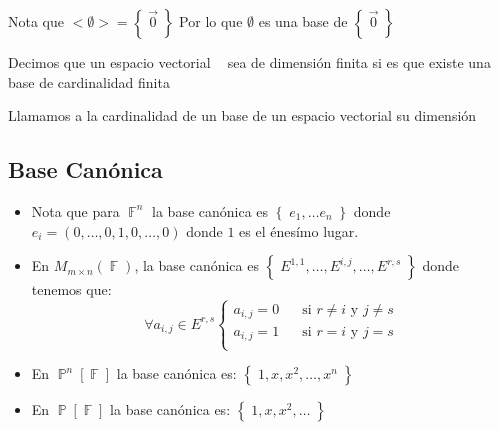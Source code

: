 \documentclass[12pt, fleqn]{report}                             %
\DeclareMathOperator \Space {\quad}                             %
\theoremstyle{break}                                            %
\DeclareMathOperator \GenericField {\mathbb{F}}                 %
\DeclareMathOperator \VectorSet    {\mathbb{V}}                 %
\DeclareMathOperator \Polynomials  {\mathbb{P}}                 %
\DeclareMathOperator \VectorSpace  {\VectorSet_{\GenericField}} %
\newcommand{\Set}[1]    {\left\{ \; #1 \; \right\}}             %
\begin{document}
                Nota que $<\emptyset> = \Set{\vec 0}$
                Por lo que $\emptyset$ es una base de $\Set{\vec 0}$

                Decimos que un espacio vectorial $\VectorSpace$ sea de dimensión finita si es que existe
                una base de cardinalidad finita

                Llamamos a la cardinalidad de un base de un espacio vectorial su dimensión




            \vspace{1em}
            \subsection{Base Canónica}

                \begin{itemize}
                    
                    \item 
                        Nota que para $\GenericField^n$ la base canónica es $\Set{e_1, \dots e_n}$
                        donde $e_i = (0, \dots, 0,1,0, \dots, 0)$ donde $1$ es el énesímo lugar.

                    \item
                        En $M_{m \times n}(\GenericField)$, la base canónica es 
                        $\Set{E^{1, 1}, \dots, E^{i, j}, \dots, E^{r, s}}$ donde tenemos que:
                        \begin{equation*}
                            \forall a_{i, j} \in E^{r, s}
                            \begin{cases}
                                a_{i, j} = 0 \Space \text{si $r \neq i$ y $j \neq s$}   \\
                                a_{i, j} = 1 \Space \text{si $r=i$ y $j=s$}             \\
                            \end{cases}   
                        \end{equation*}

                    \item
                        En $\Polynomials^n[\GenericField]$ la base canónica es:
                        $\Set{1, x, x^2, \dots, x^n}$

                    \item
                        En $\Polynomials[\GenericField]$ la base canónica es:
                        $\Set{1, x, x^2, \dots}$

                \end{itemize}
\end{document}
